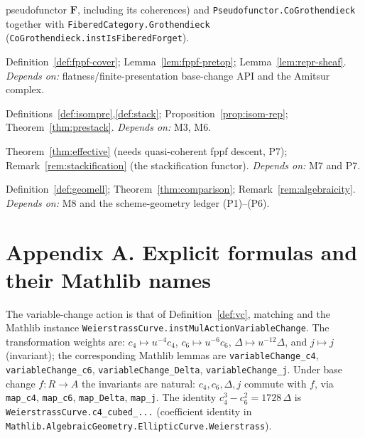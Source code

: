\documentclass[11pt]{article}
\theoremstyle{definition}
\theoremstyle{plain}
\theoremstyle{remark}
\begin{document}
\begin{description}[leftmargin=3.4em,style=nextline]
  pseudofunctor $\mathbf F$, including its coherences) and
  \texttt{Pseudofunctor.CoGrothendieck} together with
  \texttt{FiberedCategory.Grothendieck}
  (\texttt{CoGrothendieck.instIsFiberedForget}).
\item[\textbf{M6} — fppf site.]  Definition~\ref{def:fppf-cover};
  Lemma~\ref{lem:fppf-pretop}; Lemma~\ref{lem:repr-sheaf}.  \emph{Depends on:}
  flatness/finite-presentation base-change API and the Amitsur complex.
\item[\textbf{M7} — Prestack.]  Definitions~\ref{def:isompre},\ref{def:stack};
  Proposition~\ref{prop:isom-rep}; Theorem~\ref{thm:prestack}.  \emph{Depends on:}
  M3, M6.
\item[\textbf{M8} — Descent and stackification.]  Theorem~\ref{thm:effective}
  (needs quasi-coherent fppf descent, P7); Remark~\ref{rem:stackification} (the
  stackification functor).  \emph{Depends on:} M7 and P7.
\item[\textbf{M9} — Geometric comparison.]  Definition~\ref{def:geomell};
  Theorem~\ref{thm:comparison}; Remark~\ref{rem:algebraicity}.  \emph{Depends on:}
  M8 and the scheme-geometry ledger (P1)--(P6).
\end{description}

\section*{Appendix A. Explicit formulas and their Mathlib names}

The variable-change action is that of Definition~\ref{def:vc}, matching
\cite[III, Table~3.1]{Silverman} and the Mathlib instance
\texttt{WeierstrassCurve.instMulActionVariableChange}.  The transformation weights
are: $c_4\mapsto u^{-4}c_4$, $c_6\mapsto u^{-6}c_6$, $\Delta\mapsto
u^{-12}\Delta$, and $j\mapsto j$ (invariant); the corresponding Mathlib lemmas are
\texttt{variableChange\_c4}, \texttt{variableChange\_c6},
\texttt{variableChange\_Delta}, \texttt{variableChange\_j}.  Under base change
$f:R\to A$ the invariants are natural: $c_4,c_6,\Delta,j$ commute with $f$, via
\texttt{map\_c4}, \texttt{map\_c6}, \texttt{map\_Delta}, \texttt{map\_j}.  The
identity $c_4^3-c_6^2=1728\,\Delta$ is \texttt{WeierstrassCurve.c4\_cubed\_...}
(coefficient identity in \texttt{Mathlib.AlgebraicGeometry.EllipticCurve.Weierstrass}).
\end{document}
